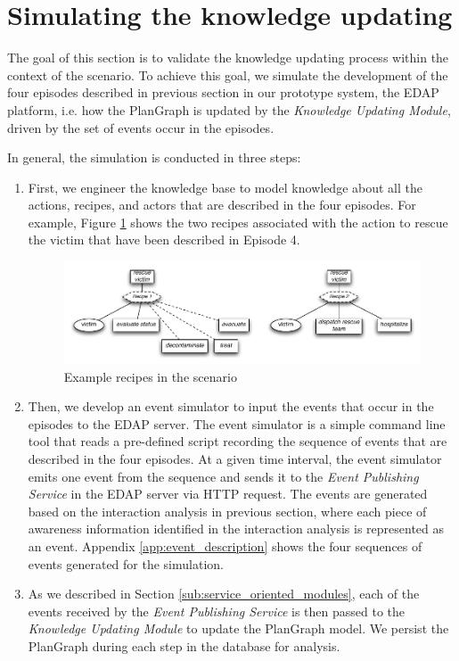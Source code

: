 \section{Simulating the knowledge updating} %
\label{sec:simulating_the_knowledge_updating}
The goal of this section is to validate the knowledge updating process within the context of the scenario. To achieve this goal, we simulate the development of the four episodes described in previous section in our prototype system, the EDAP platform, i.e. how the PlanGraph is updated by the \emph{Knowledge Updating Module}, driven by the set of events occur in the episodes. 

In general, the simulation is conducted in three steps:

\begin{enumerate}
	\item First, we engineer the knowledge base to model knowledge about all the actions, recipes, and actors that are described in the four episodes. For example, Figure \ref{fig:example_recipes_in_scenario} shows the two recipes associated with the action to rescue the victim that have been described in Episode 4.
	\begin{figure}[htbp] %
   		\centering
   		\includegraphics[width=5.8in]{example_recipes_in_scenario.pdf} 
   		\caption{Example recipes in the scenario}
   		\label{fig:example_recipes_in_scenario}
	\end{figure}
	\item Then, we develop an event simulator to input the events that occur in the episodes to the EDAP server. The event simulator is a simple command line tool that reads a pre-defined script recording the sequence of events that are described in the four episodes. At a given time interval, the event simulator emits one event from the sequence and sends it to the \emph{Event Publishing Service} in the EDAP server via HTTP request. The events are generated based on the interaction analysis in previous section, where each piece of awareness information identified in the interaction analysis is represented as an event. Appendix \ref{app:event_description} shows the four sequences of events generated for the simulation.
	\item As we described in Section \ref{sub:service_oriented_modules}, each of the events received by the \emph{Event Publishing Service} is then passed to the \emph{Knowledge Updating Module} to update the PlanGraph model. We persist the PlanGraph during each step in the database for analysis.
\end{enumerate}

